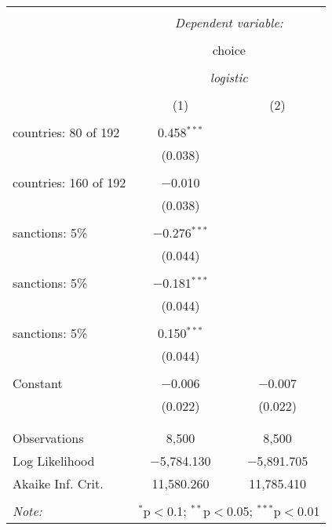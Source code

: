 
\begin{table}[!htbp] \centering 
  \caption{} 
  \label{tab:glm:null} 
\begin{tabular}{@{\extracolsep{5pt}}lcc} 
\\[-1.8ex]\hline 
\hline \\[-1.8ex] 
 & \multicolumn{2}{c}{\textit{Dependent variable:}} \\ 
\cline{2-3} 
\\[-1.8ex] & \multicolumn{2}{c}{choice} \\ 
\\[-1.8ex] & \multicolumn{2}{c}{\textit{logistic}} \\ 
\\[-1.8ex] & (1) & (2)\\ 
\hline \\[-1.8ex] 
 countries:  80 of 192 & 0.458$^{***}$ &  \\ 
  & (0.038) &  \\ 
  & & \\ 
 countries:  160 of 192 & $-$0.010 &  \\ 
  & (0.038) &  \\ 
  & & \\ 
 sanctions: 5\% & $-$0.276$^{***}$ &  \\ 
  & (0.044) &  \\ 
  & & \\ 
 sanctions: 5\% & $-$0.181$^{***}$ &  \\ 
  & (0.044) &  \\ 
  & & \\ 
 sanctions: 5\% & 0.150$^{***}$ &  \\ 
  & (0.044) &  \\ 
  & & \\ 
 Constant & $-$0.006 & $-$0.007 \\ 
  & (0.022) & (0.022) \\ 
  & & \\ 
\hline \\[-1.8ex] 
Observations & 8,500 & 8,500 \\ 
Log Likelihood & $-$5,784.130 & $-$5,891.705 \\ 
Akaike Inf. Crit. & 11,580.260 & 11,785.410 \\ 
\hline 
\hline \\[-1.8ex] 
\textit{Note:}  & \multicolumn{2}{r}{$^{*}$p$<$0.1; $^{**}$p$<$0.05; $^{***}$p$<$0.01} \\ 
\end{tabular} 
\end{table}  

